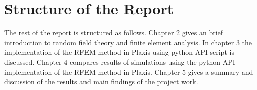\section{Structure of the Report}
The rest of the report is structured as follows. Chapter 2 gives an brief introduction to random field theory and finite element analysis. 
In chapter 3 the implementation of the RFEM method in Plaxis using python API script is discussed. 
Chapter 4 compares results of simulations using the python API implementation of the RFEM method in Plaxis. 
Chapter 5 gives a summary and discussion of the results and main findings of the project work.

